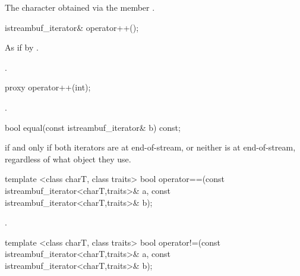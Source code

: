 \begin{itemdescr}
\pnum
\returns
The character obtained via the
member
.
\end{itemdescr}

%
\begin{itemdecl}
istreambuf_iterator& operator++();
\end{itemdecl}

\begin{itemdescr}
\pnum
\effects
As if by .

\pnum
\returns
{}.
\end{itemdescr}

%
\begin{itemdecl}
proxy operator++(int);
\end{itemdecl}

\begin{itemdescr}
\pnum
\returns
{}.
\end{itemdescr}

%
\begin{itemdecl}
bool equal(const istreambuf_iterator& b) const;
\end{itemdecl}

\begin{itemdescr}
\pnum
\returns
{}
if and only if both iterators are at end-of-stream,
or neither is at end-of-stream, regardless of what
object they use.
\end{itemdescr}

%
\begin{itemdecl}
template <class charT, class traits>
  bool operator==(const istreambuf_iterator<charT,traits>& a,
                  const istreambuf_iterator<charT,traits>& b);
\end{itemdecl}

\begin{itemdescr}
\pnum
\returns
{}.
\end{itemdescr}

%
\begin{itemdecl}
template <class charT, class traits>
  bool operator!=(const istreambuf_iterator<charT,traits>& a,
                  const istreambuf_iterator<charT,traits>& b);
\end{itemdecl}

